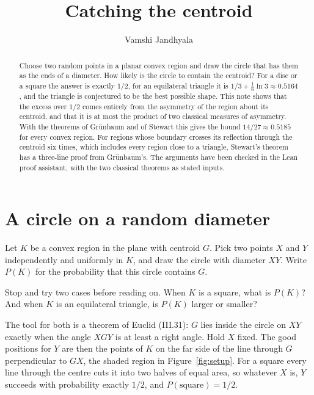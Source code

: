 \documentclass[11pt]{article}
\title{Catching the centroid}
\author{Vamshi Jandhyala}
\date{}
\theoremstyle{remark}
\begin{document}
\maketitle
\vspace{-2em}

\begin{abstract}
Choose two random points in a planar convex region and draw the circle that has them as the ends of a
diameter. How likely is the circle to contain the centroid? For a disc or a square the answer is exactly
$1/2$, for an equilateral triangle it is $1/3+\tfrac16\ln 3\approx 0.5164$, and the triangle is
conjectured to be the best possible shape. This note shows that the excess over $1/2$ comes entirely from
the asymmetry of the region about its centroid, and that it is at most the product of two classical
measures of asymmetry. With the theorems of Gr\"unbaum and of Stewart this gives the bound
$14/27\approx 0.5185$ for every convex region. For regions whose boundary crosses its reflection
through the centroid six times, which includes every region close to a triangle, Stewart's theorem
has a three-line proof from Gr\"unbaum's. The arguments have been checked in the Lean proof
assistant, with the two classical theorems as stated inputs.
\end{abstract}

\section{A circle on a random diameter}

Let $K$ be a convex region in the plane with centroid $G$. Pick two points $X$ and $Y$ independently and
uniformly in $K$, and draw the circle with diameter $XY$. Write $P(K)$ for the probability that this
circle contains $G$.

Stop and try two cases before reading on. When $K$ is a square, what is $P(K)$? And when $K$ is an
equilateral triangle, is $P(K)$ larger or smaller?

The tool for both is a theorem of Euclid (III.31): $G$ lies inside the circle on $XY$ exactly when the
angle $XGY$ is at least a right angle. Hold $X$ fixed. The good positions for $Y$ are then the points of
$K$ on the far side of the line through $G$ perpendicular to $GX$, the shaded region in
Figure~\ref{fig:setup}. For a square every line through the centre cuts it into two halves of equal area,
so whatever $X$ is, $Y$ succeeds with probability exactly $1/2$, and $P(\text{square})=1/2$.
\end{document}
